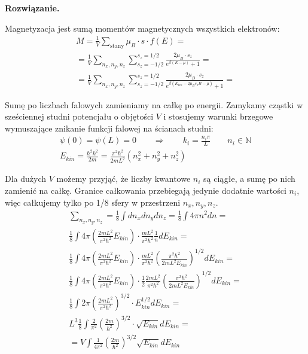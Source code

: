 \documentclass[11pt,a4paper]{article}
\newenvironment{solution}{\vspace{1cm} \par\textbf{Rozwiązanie.} \vspace{1cm}}{}
\begin{document}
\begin{solution}

Magnetyzacja jest sumą momentów magnetycznych wszystkich elektronów:
\begin{align*}
M = \frac{1}{V} \sum_{\text{stany}} \mu_B \cdot s \cdot f(E) = \\
= \frac{1}{V} \sum_{n_x, n_y, n_z} \sum_{s_z=-1/2}^{s_z=1/2} \frac{2\mu_B \cdot s_z }{e^{\beta (E - \mu)} + 1} = \\
= \frac{1}{V} \sum_{n_x, n_y, n_z} \sum_{s_z=-1/2}^{s_z=1/2} \frac{2\mu_B \cdot s_z }{e^{\beta (E_{kin} - 2\mu_B s_z B - \mu)} + 1} =
\end{align*}

Sumę po liczbach falowych zamieniamy na całkę po energii. Zamykamy cząstki w sześciennej 
studni potencjału o objętości $V$ i stosujemy warunki brzegowe wymuszające 
znikanie funkcji falowej na ścianach studni:
\begin{align*}
\psi(0) = \psi(L) = 0 \qquad \Rightarrow \qquad k_i = \frac{n_i \pi}{L} \qquad n_i \in \mathbb{N} \\
E_{kin} = \frac{\hbar^2 k^2}{2m} = \frac{\pi^2 \hbar^2}{2mL^2} (n_x^2 + n_y^2 + n_z^2)
\end{align*}

Dla dużych $V$ możemy przyjąć, że liczby kwantowe $n_i$ są ciągłe, a sumę po nich 
zamienić na całkę. Granice całkowania przebiegają jedynie dodatnie wartości $n_i$, 
więc całkujemy tylko po 1/8 sfery w przestrzeni $n_x, n_y, n_z$.
\begin{align*}
\sum_{n_x, n_y, n_z} = \frac{1}{8}\int dn_x dn_y dn_z = \frac{1}{8}\int 4\pi n^2 dn = \\
\frac{1}{8} \int 4\pi \left( \frac{2mL^2}{\pi^2 \hbar^2} E_{kin} \right) \cdot 
\frac{mL^2}{\pi^2 \hbar^2} \frac{1}{n} dE_{kin} = \\
\frac{1}{8} \int 4\pi \left( \frac{2mL^2}{\pi^2 \hbar^2} E_{kin} \right) \cdot 
\frac{mL^2}{\pi^2 \hbar^2} \left(\frac{\pi^2 \hbar^2}{2mL^2 E_{kin}}\right)^{1/2} dE_{kin} = \\
\frac{1}{8} \int 4\pi \left( \frac{2mL^2}{\pi^2 \hbar^2} E_{kin} \right) \cdot 
\frac{1}{2}\frac{2mL^2}{\pi^2 \hbar^2} \left(\frac{\pi^2 \hbar^2}{2mL^2 E_{kin}}\right)^{1/2} dE_{kin} = \\
\frac{1}{8} \int 2\pi \left( \frac{2mL^2}{\pi^2 \hbar^2} \right)^{3/2} \cdot 
E_{kin}^{1/2} dE_{kin} = \\
L^{3} \frac{1}{8} \int \frac{2}{\pi^{2}} \left( \frac{2m}{\hbar^2} \right)^{3/2} \cdot 
\sqrt{E_{kin}} dE_{kin} = \\
= V \int \frac{1}{4\pi^{2}} \left( \frac{2m}{\hbar^2} \right)^{3/2} \sqrt{E_{kin}} dE_{kin}
\end{align*}


\end{solution}
\end{document}
